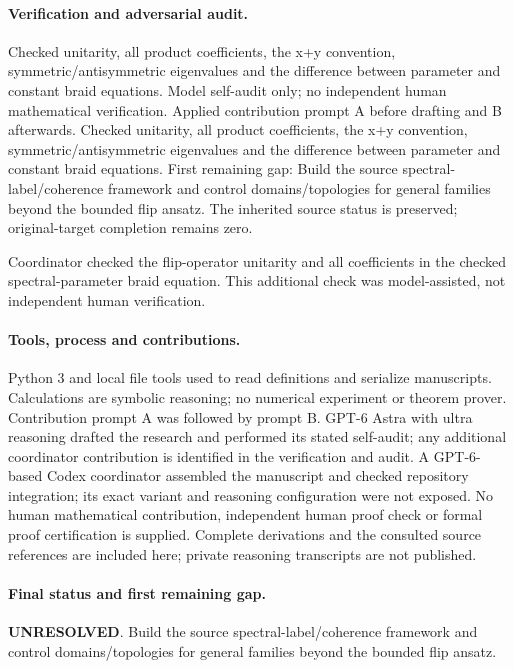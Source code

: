 \documentclass[11pt]{article}
\begin{document}
\paragraph{Verification and adversarial audit.}
Checked unitarity, all product coefficients, the x+y convention, symmetric/antisymmetric eigenvalues and the difference between parameter and constant braid equations. Model self-audit only; no independent human mathematical verification. Applied contribution prompt A before drafting and B afterwards. Checked unitarity, all product coefficients, the x+y convention, symmetric/antisymmetric eigenvalues and the difference between parameter and constant braid equations. First remaining gap: Build the source spectral-label/coherence framework and control domains/topologies for general families beyond the bounded flip ansatz. The inherited source status is preserved; original-target completion remains zero.

Coordinator checked the flip-operator unitarity and all coefficients in the checked spectral-parameter braid equation. This additional check was model-assisted, not independent human verification.

\paragraph{Tools, process and contributions.}
Python 3 and local file tools used to read definitions and serialize manuscripts. Calculations are symbolic reasoning; no numerical experiment or theorem prover. Contribution prompt A was followed by prompt B. GPT-6 Astra with ultra reasoning drafted the research and performed its stated self-audit; any additional coordinator contribution is identified in the verification and audit. A GPT-6-based Codex coordinator assembled the manuscript and checked repository integration; its exact variant and reasoning configuration were not exposed. No human mathematical contribution, independent human proof check or formal proof certification is supplied. Complete derivations and the consulted source references are included here; private reasoning transcripts are not published.

\paragraph{Final status and first remaining gap.}
\textbf{UNRESOLVED}. Build the source spectral-label/coherence framework and control domains/topologies for general families beyond the bounded flip ansatz.
\end{document}
